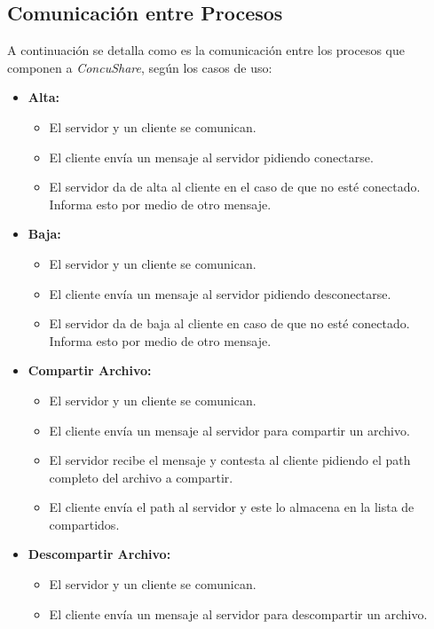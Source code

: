 \documentclass[a4paper,10pt]{article}
\begin{document}
		\subsection{Comunicaci\'on entre Procesos}
			A continuaci\'on se detalla como es la comunicaci\'on entre los procesos que componen a \emph{ConcuShare}, seg\'un los casos de uso:
			\begin{itemize}
				\item \textbf{Alta:}	
					\begin{itemize}
						\item El servidor y un cliente se comunican.
						\item El cliente env\'ia un mensaje al servidor pidiendo conectarse.
						\item El servidor da de alta al cliente en el caso de que no est\'e conectado. Informa esto por medio de 
									otro mensaje.
					\end{itemize}
				\item \textbf{Baja:}	
					\begin{itemize}
						\item El servidor y un cliente se comunican.
						\item El cliente env\'ia un mensaje al servidor pidiendo desconectarse.
						\item El servidor da de baja al cliente en caso de que no est\'e conectado. Informa esto por medio de
									otro mensaje.
					\end{itemize}
				\item \textbf{Compartir Archivo:}	
					\begin{itemize}
						\item El servidor y un cliente se comunican.
						\item El cliente env\'ia un mensaje al servidor para compartir un archivo.
						\item El servidor recibe el mensaje y contesta al cliente pidiendo el path completo del
									archivo a compartir.
						\item El cliente env\'ia el path al servidor y este lo almacena en la lista de compartidos. 
					\end{itemize}
				\item \textbf{Descompartir Archivo:} 
					\begin{itemize}
						\item El servidor y un cliente se comunican.
						\item El cliente env\'ia un mensaje al servidor para descompartir un archivo.

\end{itemize}
\end{itemize}
\end{document}
